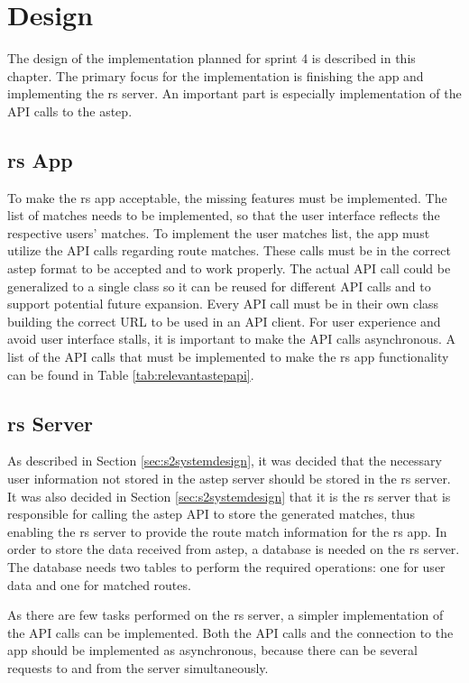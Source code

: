 \section{Design}
The design of the implementation planned for sprint 4 is described in this chapter.
The primary focus for the implementation is finishing the app and implementing the \gls{rs} server.
An important part is especially implementation of the API calls to the \gls{astep}.

\subsection{\gls{rs} App}
To make the \gls{rs} app acceptable, the missing features must be implemented.
The list of matches needs to be implemented, so that the user interface reflects the respective users' matches.
To implement the user matches list, the app must utilize the API calls regarding route matches.
These calls must be in the correct \gls{astep} format to be accepted and to work properly.
The actual API call could be generalized to a single class so it can be reused for different API calls and to support potential future expansion.
Every API call must be in their own class building the correct URL to be used in an API client.
For user experience and avoid user interface stalls, it is important to make the API calls asynchronous. 
A list of the API calls that must be implemented to make the \gls{rs} app functionality can be found in Table \ref{tab:relevantastepapi}.

\subsection{\gls{rs} Server}
As described in Section \ref{sec:s2systemdesign}, it was decided that the necessary user information not stored in the \gls{astep} server should be stored in the \gls{rs} server.
It was also decided in Section \ref{sec:s2systemdesign} that it is the \gls{rs} server that is responsible for calling the \gls{astep} API to store the generated matches, thus enabling the \gls{rs} server to provide the route match information for the \gls{rs} app.
In order to store the data received from \gls{astep}, a database is needed on the \gls{rs} server.
The database needs two tables to perform the required operations: one for user data and one for matched routes.

As there are few tasks performed on the \gls{rs} server, a simpler implementation of the API calls can be implemented.
Both the API calls and the connection to the app should be implemented as asynchronous, because there can be several requests to and from the server simultaneously. 